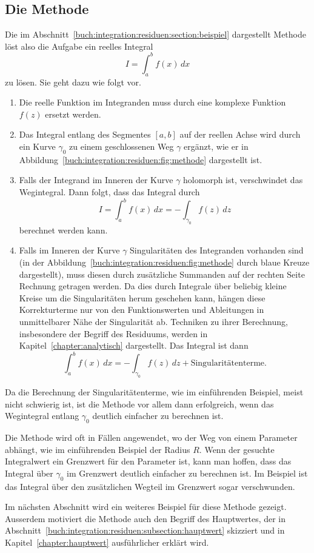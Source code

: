 %
%
%
\subsection{Die Methode}
Die im Abschnitt~\ref{buch:integration:residuen:section:beispiel}
dargestellt Methode löst also die Aufgabe ein reelles Integral
%
\[
I
=
\int_a^b f(x)\,dx
\]
zu lösen.
Sie geht dazu wie folgt vor.

\begin{enumerate}
\item
Die reelle Funktion im Integranden muss durch eine komplexe
Funktion $f(z)$ ersetzt werden.
\item
Das Integral entlang des Segmentes $[a,b]$ auf der reellen Achse
wird durch ein Kurve $\gamma_0$ zu einem geschlossenen Weg $\gamma$
ergänzt, wie er in
Abbildung~\ref{buch:integration:residuen:fig:methode}
dargestellt ist.
\item
Falls der Integrand im Inneren der Kurve $\gamma$ holomorph ist,
verschwindet das Wegintegral.
Dann folgt, dass das Integral durch
\[
I
=
\int_a^b f(x)\,dx
=
-\int_{\gamma_0} f(z)\,dz
\]
berechnet werden kann.
\item
Falls im Inneren der Kurve $\gamma$ Singularitäten des Integranden
vorhanden sind (in der Abbildung~\ref{buch:integration:residuen:fig:methode}
durch blaue Kreuze dargestellt), muss diesen durch zusätzliche
Summanden auf der rechten Seite Rechnung getragen werden.
%
Da dies durch Integrale über beliebig kleine Kreise um die Singularitäten
herum geschehen kann, hängen diese Korrekturterme nur von den
Funktionswerten und Ableitungen in unmittelbarer Nähe der
Singularität ab.
Techniken zu ihrer Berechnung, insbesondere der Begriff des Residuums,
%
werden in Kapitel~\ref{chapter:analytisch} dargestellt.
Das Integral ist dann
\[
\int_a^b f(x)\,dx
=
-\int_{\gamma_0} f(z)\,dz
+
\text{Singularitätenterme.}
\]
\end{enumerate}
Da die Berechnung der Singularitätenterme, wie im einführenden Beispiel,
meist nicht schwierig ist, ist die Methode vor allem dann erfolgreich,
wenn das Wegintegral entlang $\gamma_0$ deutlich einfacher zu berechnen
ist.

Die Methode wird oft in Fällen angewendet, wo der Weg von einem
Parameter abhängt, wie im einführenden Beispiel der Radius $R$.
Wenn der gesuchte Integralwert ein Grenzwert für den Parameter ist,
kann man hoffen, dass das Integral über $\gamma_0$ im Grenzwert
deutlich einfacher zu berechnen ist.
Im Beispiel ist das Integral über den zusätzlichen Wegteil im
Grenzwert sogar verschwunden.

Im nächsten Abschnitt wird ein weiteres Beispiel für diese Methode
gezeigt. 
Ausserdem motiviert die Methode auch den Begriff des Hauptwertes,
der in Abschnitt~\ref{buch:integration:residuen:subsection:hauptwert}
skizziert und in Kapitel~\ref{chapter:hauptwert} ausführlicher
erklärt wird.
